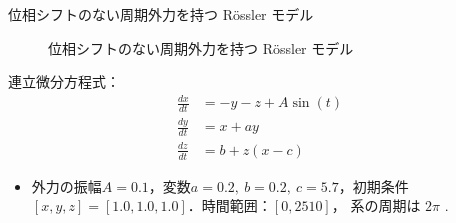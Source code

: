 \begin{frame}{位相シフトのない周期外力を持つ Rössler モデル}
\begin{minipage}{0.59\textwidth}
\begin{figure}
                \vspace{-.3em}
                \caption{位相シフトのない周期外力を持つ Rössler モデル}
                \label{rossler_+sin_3.png} %
            \end{figure}
        \end{minipage}
        \begin{minipage}{0.4\textwidth}
            連立微分方程式：
            \begin{align}
                \frac{dx}{dt} &= -y - z + A \sin(t)\\
                \frac{dy}{dt} &= x + ay \\
                \frac{dz}{dt} &= b + z(x - c)
            \end{align}
            \vspace{-.5cm}
            \begin{itemize}
                \item 外力の振幅$A = 0.1$，変数$a = 0.2,\ b = 0.2,\ c = 5.7$，初期条件$ \left[ x, y, z \right] = [1.0, 1.0, 1.0]$．時間範囲：$[0, 2510]$， 系の周期は $2\pi$ .
            \end{itemize}
        \end{minipage}
\end{frame}


